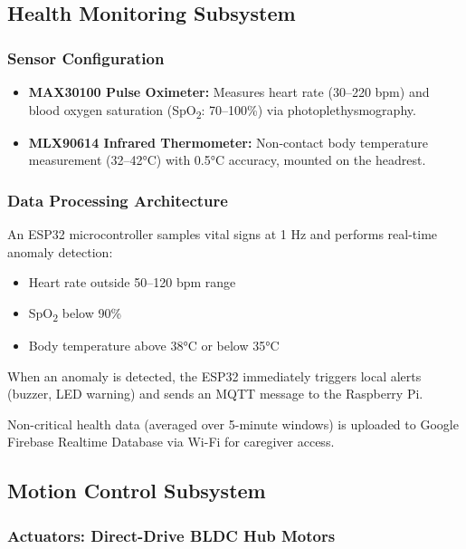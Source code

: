 \documentclass[12pt,a4paper]{report}
\begin{document}
\subsection{Health Monitoring Subsystem}

\subsubsection{Sensor Configuration}

\begin{itemize}
    \item \textbf{MAX30100 Pulse Oximeter:} Measures heart rate (30--220 bpm) and blood oxygen saturation (SpO\textsubscript{2}: 70--100\%) via photoplethysmography.
    \item \textbf{MLX90614 Infrared Thermometer:} Non-contact body temperature measurement (32--42°C) with 0.5°C accuracy, mounted on the headrest.
    
\end{itemize}

\subsubsection{Data Processing Architecture}

An ESP32 microcontroller samples vital signs at 1 Hz and performs real-time anomaly detection:
\begin{itemize}
    \item Heart rate outside 50--120 bpm range
    \item SpO\textsubscript{2} below 90\%
    \item Body temperature above 38°C or below 35°C
\end{itemize}

When an anomaly is detected, the ESP32 immediately triggers local alerts (buzzer, LED warning) and sends an MQTT message to the Raspberry Pi.

Non-critical health data (averaged over 5-minute windows) is uploaded to Google Firebase Realtime Database via Wi-Fi for caregiver access.

\subsection{Motion Control Subsystem}

\subsubsection{Actuators: Direct-Drive BLDC Hub Motors}
\end{document}

